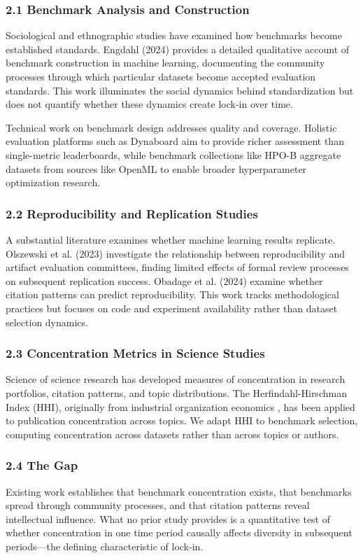 
\subsubsection{2.1 Benchmark Analysis and Construction}

Sociological and ethnographic studies have examined how benchmarks become established standards. Engdahl (2024) provides a detailed qualitative account of benchmark construction in machine learning, documenting the community processes through which particular datasets become accepted evaluation standards. This work illuminates the social dynamics behind standardization but does not quantify whether these dynamics create lock-in over time.

Technical work on benchmark design addresses quality and coverage. Holistic evaluation platforms such as Dynaboard \citep{ma2021dynaboard} aim to provide richer assessment than single-metric leaderboards, while benchmark collections like HPO-B \citep{pineda2021hpob} aggregate datasets from sources like OpenML to enable broader hyperparameter optimization research.

\subsubsection{2.2 Reproducibility and Replication Studies}

A substantial literature examines whether machine learning results replicate. Olszewski et al. (2023) investigate the relationship between reproducibility and artifact evaluation committees, finding limited effects of formal review processes on subsequent replication success. Obadage et al. (2024) examine whether citation patterns can predict reproducibility. This work tracks methodological practices but focuses on code and experiment availability rather than dataset selection dynamics.

\subsubsection{2.3 Concentration Metrics in Science Studies}

Science of science research has developed measures of concentration in research portfolios, citation patterns, and topic distributions. The Herfindahl-Hirschman Index (HHI), originally from industrial organization economics \citep{herfindahl1950concentration}, has been applied to publication concentration across topics. We adapt HHI to benchmark selection, computing concentration across datasets rather than across topics or authors.

\subsubsection{2.4 The Gap}

Existing work establishes that benchmark concentration exists, that benchmarks spread through community processes, and that citation patterns reveal intellectual influence. What no prior study provides is a quantitative test of whether concentration in one time period causally affects diversity in subsequent periods---the defining characteristic of lock-in.

